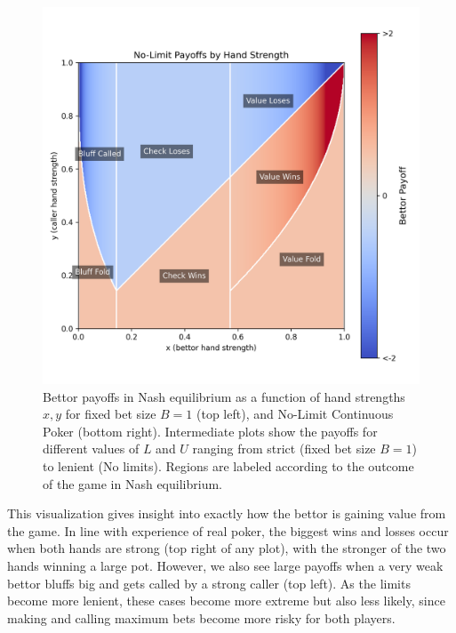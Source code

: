 \documentclass[a4paper,12pt]{article}
\theoremstyle{plain}
\theoremstyle{definition}
\begin{document}
\begin{figure}[h!]
\begin{adjustwidth}{-1in}{-1in}
\begin{minipage}{0.4\textwidth}
        \end{minipage}
        \hspace{0.02\textwidth}
        \begin{minipage}{0.4\textwidth}
            \centering
            \includegraphics[width=\textwidth]{NoLimit_payoffs.png}
        \end{minipage}
    \end{adjustwidth}
    \caption{Bettor payoffs in Nash equilibrium as a function of hand strengths $x, y$ for fixed bet size $B=1$ (top left), and No-Limit Continuous Poker (bottom right). Intermediate plots show the payoffs for different values of $L$ and $U$ ranging from strict (fixed bet size $B=1$) to lenient (No limits). Regions are labeled according to the outcome of the game in Nash equilibrium.}
    \label{fig:payoffs}
\end{figure}

This visualization gives insight into exactly how the bettor is gaining value from the game. In line with experience of real poker, the biggest wins and losses occur when both hands are strong (top right of any plot), with the stronger of the two hands winning a large pot. However, we also see large payoffs when a very weak bettor bluffs big and gets called by a strong caller (top left). As the limits become more lenient, these cases become more extreme but also less likely, since making and calling maximum bets become more risky for both players. 
\end{document}
